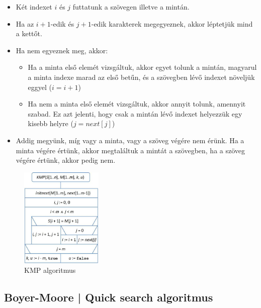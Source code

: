 \documentclass[margin=0px]{article}
\begin{document}
	\begin{itemize}
    	\item Két indexet $i$ és $j$ futtatunk a szövegen illetve a mintán.
    	\item Ha az $i+1$-edik és $j+1$-edik karakterek megegyeznek, akkor léptetjük mind a kettőt.
    	\item Ha nem egyeznek meg, akkor:
    	\begin{itemize}
            \item Ha a minta első elemét vizsgáltuk, akkor egyet tolunk a mintán, magyarul a minta indexe marad az első betűn, és a szövegben lévő indexet növeljük eggyel ($i=i+1$)
            \item Ha nem a minta első elemét vizsgáltuk, akkor annyit tolunk, amennyit szabad. Ez azt jelenti, hogy csak a mintán lévő indexet helyezzük egy kisebb helyre ($j = next[j]$)
    	\end{itemize}
        \item Addig megyünk, míg vagy a minta, vagy a szöveg végére nem érünk. Ha a minta végére értünk, akkor megtaláltuk a mintát a szövegben, ha a szöveg végére értünk, akkor pedig nem.
			\end{itemize}
			
			\begin{figure}[H]
				\centering
				\includegraphics[width=0.35\textwidth]{img/KMP_algo.png}
				\caption{KMP algoritmus}
				\label{fig:KMP}
			\end{figure}

	\subsection*{Boyer-Moore  | Quick search algoritmus}
\end{document}
